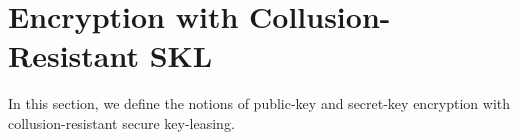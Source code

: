
\section{Encryption with Collusion-Resistant SKL} 
\label{sec:cr-skl-defs}
In this section, we define the notions of public-key and secret-key
encryption with collusion-resistant secure key-leasing.
